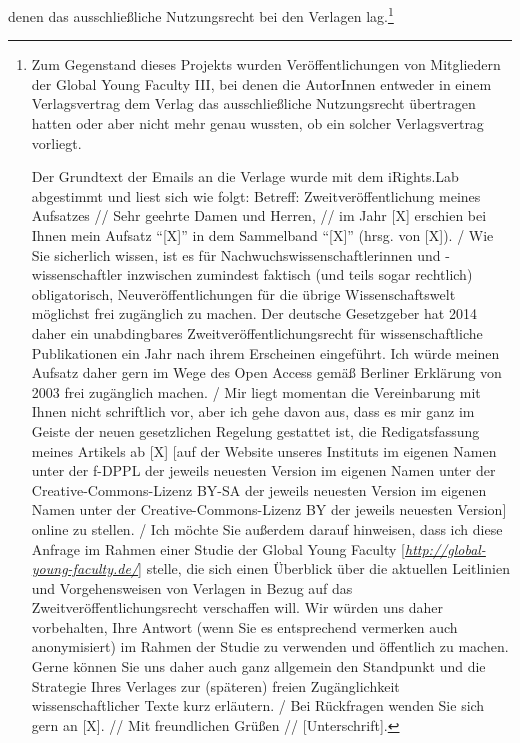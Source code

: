 \documentclass[a4paper,
fontsize=11pt,
oneside,
numbers=noperiodatend,
parskip=half-,
bibliography=totoc,
final
]{scrartcl}
\begin{document}
denen das ausschließliche Nutzungsrecht bei den Verlagen lag.\footnote{Zum
  Gegenstand dieses Projekts wurden Veröffentlichungen von Mitgliedern
  der Global Young Faculty III, bei denen die AutorInnen entweder in
  einem Verlagsvertrag dem Verlag das ausschließliche Nutzungsrecht
  übertragen hatten oder aber nicht mehr genau wussten, ob ein solcher
  Verlagsvertrag vorliegt.

  Der Grundtext der Emails an die Verlage wurde mit dem iRights.Lab
  abgestimmt und liest sich wie folgt: Betreff: Zweitveröffentlichung
  meines Aufsatzes // Sehr geehrte Damen und Herren, // im Jahr {[}X{]}
  erschien bei Ihnen mein Aufsatz \enquote{{[}X{]}} in dem Sammelband
  \enquote{{[}X{]}} (hrsg. von {[}X{]}). / Wie Sie sicherlich wissen,
  ist es für Nachwuchswissenschaftlerinnen und -wissenschaftler
  inzwischen zumindest faktisch (und teils sogar rechtlich)
  obligatorisch, Neuveröffentlichungen für die übrige Wissenschaftswelt
  möglichst frei zugänglich zu machen. Der deutsche Gesetzgeber hat 2014
  daher ein unabdingbares Zweitveröffentlichungsrecht für
  wissenschaftliche Publikationen ein Jahr nach ihrem Erscheinen
  eingeführt. Ich würde meinen Aufsatz daher gern im Wege des Open
  Access gemäß Berliner Erklärung von 2003 frei zugänglich machen. / Mir
  liegt momentan die Vereinbarung mit Ihnen nicht schriftlich vor, aber
  ich gehe davon aus, dass es mir ganz im Geiste der neuen gesetzlichen
  Regelung gestattet ist, die Redigatsfassung meines Artikels ab {[}X{]}
  {[}auf der Website unseres Instituts \textbar{} im eigenen Namen unter
  der f-DPPL der jeweils neuesten Version \textbar{} im eigenen Namen
  unter der Creative-Commons-Lizenz BY-SA der jeweils neuesten Version
  \textbar{} im eigenen Namen unter der Creative-Commons-Lizenz BY der
  jeweils neuesten Version{]} online zu stellen. / Ich möchte Sie
  außerdem darauf hinweisen, dass ich diese Anfrage im Rahmen einer
  Studie der Global Young Faculty
  {[}\href{http://global-young-faculty.de/}{\emph{http://global-young-faculty.de/}}{]}
  stelle, die sich einen Überblick über die aktuellen Leitlinien und
  Vorgehensweisen von Verlagen in Bezug auf das
  Zweitveröffentlichungsrecht verschaffen will. Wir würden uns daher
  vorbehalten, Ihre Antwort (wenn Sie es entsprechend vermerken auch
  anonymisiert) im Rahmen der Studie zu verwenden und öffentlich zu
  machen. Gerne können Sie uns daher auch ganz allgemein den Standpunkt
  und die Strategie Ihres Verlages zur (späteren) freien Zugänglichkeit
  wissenschaftlicher Texte kurz erläutern. / Bei Rückfragen wenden Sie
  sich gern an {[}X{]}. // Mit freundlichen Grüßen //
  {[}Unterschrift{]}.}
\end{document}
